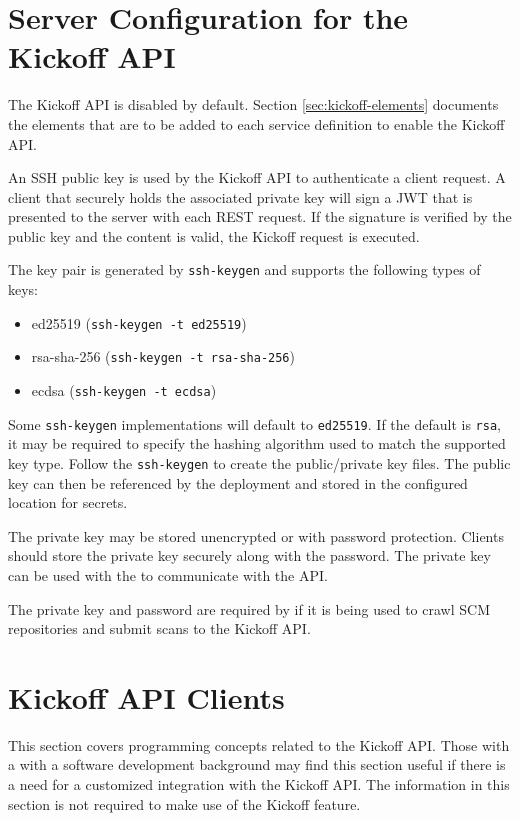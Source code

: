 \section{Server Configuration for the Kickoff API}\label{sec:kickoff-server-config}

The Kickoff API is disabled by default.  Section \ref{sec:kickoff-elements} documents the elements that
are to be added to each service definition to enable the Kickoff API.

An SSH public key is used by the Kickoff API to authenticate a client request.  A client that
securely holds the associated private key will sign a JWT that is presented to the server with each REST
request.  If the signature is verified by the public key and the content is valid, the Kickoff request is executed.

The key pair is generated by \texttt{ssh-keygen} and supports the following types of keys:

\begin{itemize}
  \item ed25519 (\texttt{ssh-keygen -t ed25519})
  \item rsa-sha-256 (\texttt{ssh-keygen -t rsa-sha-256})
  \item ecdsa (\texttt{ssh-keygen -t ecdsa})
\end{itemize}

Some \texttt{ssh-keygen} implementations will default to \texttt{ed25519}.  If the default is \texttt{rsa},
it may be required to specify the hashing algorithm used to match the supported key type.  Follow the
\texttt{ssh-keygen} to create the public/private key files.  The public key can then be referenced
by the \cxoneflow deployment and stored in the configured location for secrets.

The private key may be stored unencrypted or with password protection.  Clients should store the private key
securely along with the password.  The private key can be used with the 
to communicate with the API.

The private key and password are required by \cxoneflowaudit if it is being used to crawl SCM
repositories and submit scans to the Kickoff API.


\section{Kickoff API Clients}

This section covers programming concepts related to the \cxoneflow Kickoff API.  
Those with a with a software development background may find this section useful
if there is a need for a customized integration with the Kickoff API. The information
in this section is not required to make use of the \cxoneflow Kickoff feature.

